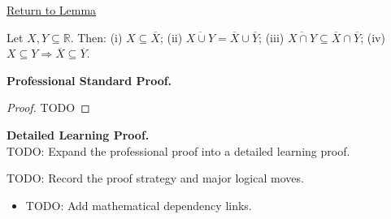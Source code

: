 \newpage
{}
\label{prf:closure-elementary}

\begin{remark*}[Return]
\hyperref[lem:closure-elementary]{Return to Lemma}
\end{remark*}

\begin{lemma*}
Let $X, Y \subseteq \mathbb{R}$. Then: (i) $X \subseteq \overline{X}$; (ii) $\overline{X \cup Y} = \overline{X} \cup \overline{Y}$; (iii) $\overline{X \cap Y} \subseteq \overline{X} \cap \overline{Y}$; (iv) $X \subseteq Y \Rightarrow \overline{X} \subseteq \overline{Y}$.
\end{lemma*}

\textbf{Professional Standard Proof.}~\\
\begin{proof}
TODO
\end{proof}

\textbf{Detailed Learning Proof.}~\\
TODO: Expand the professional proof into a detailed learning proof.

\begin{remark*}
TODO: Record the proof strategy and major logical moves.
\end{remark*}

\begin{dependencies}
\begin{itemize}
  \item TODO: Add mathematical dependency links.
\end{itemize}
\end{dependencies}
